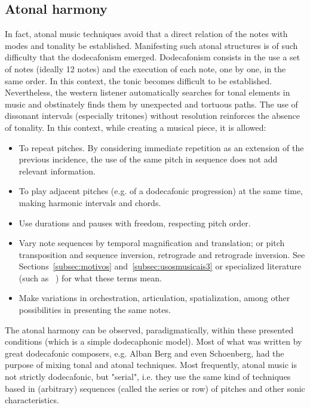 \documentclass[format=acmsmall, review=false, screen=true]{acmart}
\begin{document}
\subsection{Atonal harmony}\label{sec:atonal}
In fact, atonal music techniques avoid that a direct relation of the notes with modes and tonality be established. Manifesting such atonal structures is of such difficulty that the dodecafonism emerged. Dodecafonism consists in the use a set of notes (ideally 12 notes) and the execution of each note, one by one, in the same
order. In this context, the tonic becomes difficult to be established. Nevertheless, the western listener automatically searches for tonal elements in music and obstinately finds them by unexpected and tortuous paths. The use of dissonant intervals (especially tritones) without resolution reinforces the absence of tonality. In this context, while creating a musical
piece, it is allowed:
\begin{itemize}
     \item To repeat pitches. By considering immediate repetition as an extension of the previous incidence, the use of the same pitch in sequence does not add relevant information.
     \item To play adjacent pitches (e.g. of a dodecafonic progression) at the same time, making harmonic intervals and chords.
     \item Use durations and pauses with freedom, respecting pitch order.
     \item Vary note sequences by temporal magnification and translation; or pitch transposition and sequence inversion, retrograde and retrograde inversion. See Sections~\ref{subsec:motivos} and~\ref{subsec:usosmusicais3} or specialized literature (such as ~\cite{serial}) for what these terms mean.
     \item Make variations in orchestration, articulation, spatialization, among other possibilities in presenting the same notes.
\end{itemize}

The atonal harmony can be observed, paradigmatically, within these presented conditions (which is a simple dodecaphonic model). Most of what was written by great dodecafonic composers,
e.g. Alban Berg and even Schoenberg, had the purpose of mixing tonal and atonal techniques.
Most frequently, atonal music is not strictly dodecafonic, but "serial",
i.e. they use the same kind of techniques based in (arbitrary) sequences (called the series or row)
of pitches and other sonic characteristics.
\end{document}
